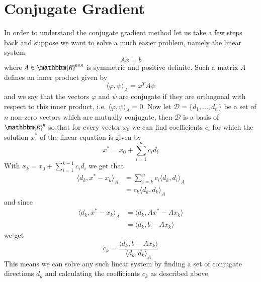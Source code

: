 \documentclass[preprint,12pt,3p]{elsarticle}
\begin{document}
\section{Conjugate Gradient}
In order to understand the conjugate gradient method let us take a few steps back and suppose we want to solve a much easier problem, namely the linear system
$$Ax=b$$
where $A\in\mathbbm{R}^{n\times n}$ is symmetric and positive definite. Such a matrix $A$ defines an inner product given by 
$$\langle \varphi,\psi\rangle_{A}=\varphi^TA\psi$$ 
and we say that the vectors $\varphi$ and $\psi$ are conjugate if they are orthogonal with respect to this inner product, i.e. $\langle \varphi,\psi\rangle_{A}=0$. Now let $\mathcal{D}=\{d_1,...,d_n\}$ be a set of $n$ non-zero vectors which are mutually conjugate, then $\mathcal{D}$ is a basis of $\mathbbm{R}^n$ so that for every vector $x_0$ we can find coefficients $c_i$ for which the solution $x^*$ of the linear equation is given by 
$$x^*=x_0+\sum_{i=1}^nc_i d_i$$
With $x_k=x_0+\sum_{i=1}^{k-1}c_i d_i$ we get that
\begin{align*}
    \langle d_k,x^*-x_k\rangle_A&=\sum_{i=k}^nc_i\langle d_k,d_i\rangle_A\\
    &=c_k\langle d_k,d_k\rangle_A
\end{align*}
and since
\begin{align*}
    \langle d_k,x^*-x_k\rangle_A&=\langle d_k, Ax^*-Ax_k\rangle\\
    &=\langle d_k, b-Ax_k\rangle
\end{align*}
we get
$$c_k=\frac{\langle d_k, b-Ax_k\rangle}{\langle d_k,d_k\rangle_A}$$
This means we can solve any such linear system by finding a set of conjugate directions $d_k$ and calculating the coefficients $c_k$ as described above. 
\end{document}

